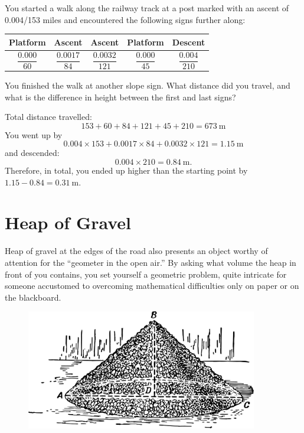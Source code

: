 \ques You started a walk along the railway track at a post marked with an ascent of 0.004/153 miles and encountered the following signs further along: 
\begin{small}
\begin{center}
\begin{tabular}{ccccc}
\toprule
Platform & Ascent & Ascent & Platform & Descent\\
\midrule 
$\dfrac{0.000}{60}$ & $\dfrac{0.0017}{84}$ & $\dfrac{0.0032}{121}$ & $\dfrac{0.000}{45}$ & $\dfrac{0.004}{210}$ \\
\bottomrule
\end{tabular}
\end{center}
\end{small}
You finished the walk at another slope sign. What distance did you travel, and what is the difference in height between the first and last signs?

\ans Total distance travelled: 
\begin{equation*}%
153 + 60 + 84 + 121+ 45 + 210 = \SI{673}{\meter}
\end{equation*}
You went up by
\begin{equation*}%
0.004 \times 153 + 0.0017 \times 84 + 0.0032 \times 121 = \SI{1.15}{\meter}
\end{equation*}
and descended:
\begin{equation*}%
0.004 \times 210 = \SI{0.84}{\meter}.
\end{equation*}
Therefore, in total, you ended up higher than the starting point by $1.15 - 0.84 = \SI{0.31}{\meter}$.

\section{Heap of Gravel}
\label{sec-4.4}

Heap of gravel at the edges of the road also presents an object worthy of attention for the ``geometer in the open air.'' By asking what volume the heap in front of you contains, you set yourself a geometric problem, quite intricate for someone accustomed to overcoming mathematical difficulties only on paper or on the blackboard. 

\begin{figure}[h!]
\centering
\includegraphics[width=0.9\textwidth]{figures/ch-04/fig-082.pdf}
\end{figure}


